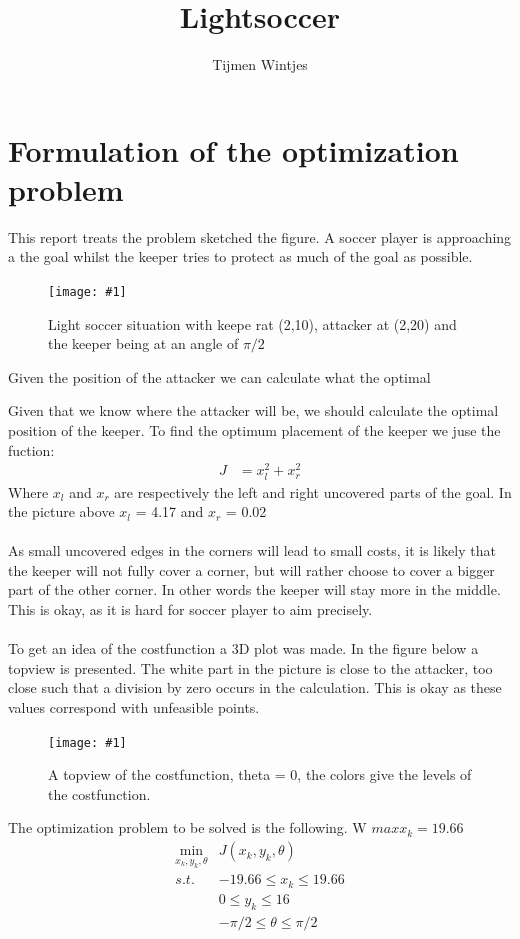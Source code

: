 \documentclass[•]{article}
\author{Tijmen Wintjes}
\title{Lightsoccer}
\newcommand{\apicture}[2] {
  \begin{figure}[H]
  \centering
  \texttt{[image: \#1]}
  \caption{#2}
  \end{figure}
  }
\begin{document}
\maketitle

\section{Formulation of the optimization problem}
This report treats the problem sketched the figure. A soccer player is approaching a the goal whilst the keeper tries to protect as much of the goal as possible. 

\apicture{soccer1.jpg}{Light soccer situation with keepe rat (2,10), attacker at (2,20) and the keeper 
being at an angle of $\pi/2$}
Given the position of the attacker we can calculate what the optimal 

Given that we know where the attacker will be, we should calculate the optimal position of the keeper. To find the optimum placement of the keeper we juse the fuction:
\begin{align*}
J &= x_l^2 + x_r^2
\end{align*}
Where $x_l$ and $x_r$ are respectively the left and right uncovered parts of the goal. In the picture above $x_l$ = 4.17 and $x_r$ = 0.02
\\\\
As small uncovered edges in the corners will lead to small costs, it is likely that the keeper will not fully cover a corner, but will rather choose to cover a bigger part of the other corner. In other words the keeper will stay more in the middle. This is okay, as it is hard for soccer player to aim precisely. 
\\\\
To get an idea of the costfunction a  3D plot was made. In the figure below a topview is presented. The white part in the picture is close to the attacker, too close such that a division by zero occurs in the calculation. This is okay as these values correspond with unfeasible points.

\apicture{costfunc.jpg}{A topview of the costfunction, theta = 0, the colors give the levels of the costfunction.}
The optimization problem to be solved is the following. W $maxx_k = 19.66$
\begin{align*}
\min\limits_{x_k,y_k,\theta} & J(x_k,y_k,\theta) \\
s.t. & -19.66 \leq x_k \leq 19.66 \\
&  0 \leq y_k \leq 16 \\
&  -\pi/2 \leq \theta \leq \pi/2 \\
\end{align*}
\end{document}
